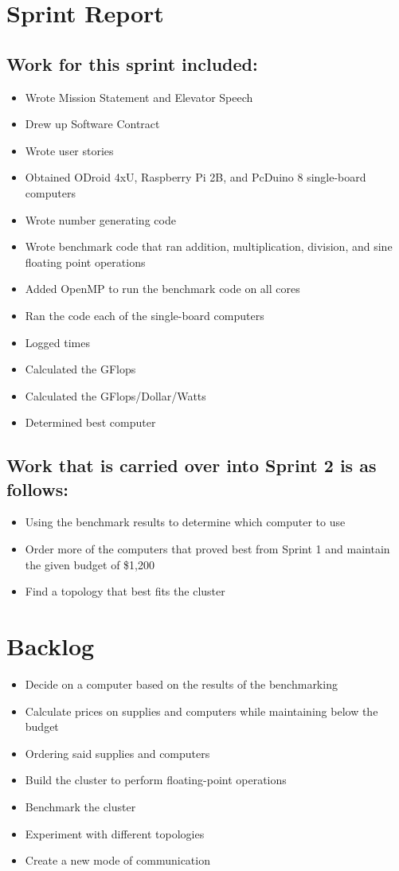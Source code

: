 \documentclass{article}
\begin{document}
\section*{Sprint Report}
\subsection*{Work for this sprint included:}
\begin{itemize}
	\item Wrote Mission Statement and Elevator Speech
	\item Drew up Software Contract
	\item Wrote user stories
	\item Obtained ODroid 4xU, Raspberry Pi 2B, and PcDuino 8 single-board computers
	\item Wrote number generating code
	\item Wrote benchmark code that ran addition, multiplication, division, and sine floating point operations
	\item Added OpenMP to run the benchmark code on all cores
	\item Ran the code each of the single-board computers
	\item Logged times
	\item Calculated the GFlops
	\item Calculated the GFlops/Dollar/Watts
	\item Determined best computer
\end{itemize}
\subsection*{Work that is carried over into Sprint 2 is as follows:}
\begin{itemize}
	\item Using the benchmark results to determine which computer to use
	\item Order more of the computers that proved best from Sprint 1 and maintain the given budget of \$1,200
	\item Find a topology that best fits the cluster
\end{itemize}

\section*{Backlog}
\begin{itemize}
	\item Decide on a computer based on the results of the benchmarking
	\item Calculate prices on supplies and computers while maintaining below the budget
	\item Ordering said supplies and computers
	\item Build the cluster to perform floating-point operations
	\item Benchmark the cluster
	\item Experiment with different topologies
	\item Create a new mode of communication
\end{itemize}
\end{document}
